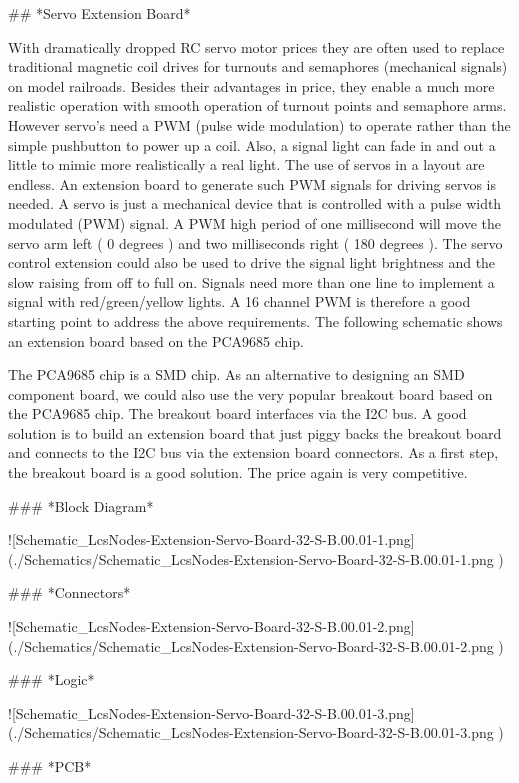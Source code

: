 ## *Servo Extension Board*

With dramatically dropped RC servo motor prices they are often used to replace traditional magnetic coil drives for turnouts and semaphores (mechanical signals) on model railroads. Besides their advantages in price, they enable a much more realistic operation with smooth operation of turnout points and semaphore arms. However servo’s need a PWM (pulse wide modulation) to operate rather than the simple pushbutton to power up a coil. Also, a signal light can fade in and out a little to mimic more realistically a real light. The use of servos in a layout are endless. An extension board to generate such PWM signals for driving servos is needed. A servo is just a mechanical device that is controlled with a pulse width modulated (PWM) signal. A PWM high period of one millisecond will move the servo arm left ( 0 degrees ) and two milliseconds right ( 180 degrees ). The servo control extension could also be used to drive the signal light brightness and the slow raising from off to full on. Signals need more than one line to implement a signal with red/green/yellow lights. A 16 channel PWM is therefore a good starting point to address the above requirements. The following schematic shows an extension board based on the PCA9685 chip.

The PCA9685 chip is a SMD chip. As an alternative to designing an SMD component board, we could also use the very popular breakout board based on the PCA9685 chip. The breakout board interfaces via the I2C bus. A good solution is to build an extension board that just piggy backs the breakout board and connects to the I2C bus via the extension board connectors. As a first step, the breakout board is a good solution. The price again is very competitive.

### *Block Diagram*

![Schematic_LcsNodes-Extension-Servo-Board-32-S-B.00.01-1.png](./Schematics/Schematic_LcsNodes-Extension-Servo-Board-32-S-B.00.01-1.png )

### *Connectors*

![Schematic_LcsNodes-Extension-Servo-Board-32-S-B.00.01-2.png](./Schematics/Schematic_LcsNodes-Extension-Servo-Board-32-S-B.00.01-2.png )

### *Logic*

![Schematic_LcsNodes-Extension-Servo-Board-32-S-B.00.01-3.png](./Schematics/Schematic_LcsNodes-Extension-Servo-Board-32-S-B.00.01-3.png )

### *PCB*

